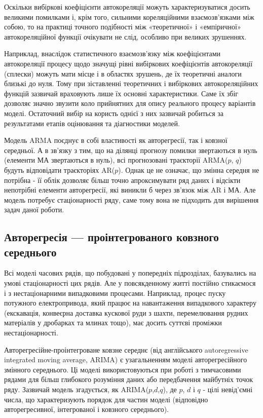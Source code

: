 Оскільки вибіркові коефіцієнти автокореляції можуть характеризуватися досить великими помилками і, крім того, сильними кореляційними взаємозв'язками між собою, то на практиці точного подібності між «теоретичної» і «емпіричної» автокореляційної функції очікувати не слід, особливо при великих зрушеннях. 

Наприклад, внаслідок статистичного взаємозв'язку між коефіцієнтами автокореляції процесу щодо значущі рівні вибіркових коефіцієнтів автокореляції (сплески) можуть мати місце і в областях зрушень, де їх теоретичні аналоги близькі до нуля. Тому при зіставленні теоретичних і вибіркових автокореляційних функцій зазвичай враховують лише їх основні характеристики. Саме їх збіг дозволяє значно звузити коло прийнятних для опису реального процесу варіантів моделі. Остаточний вибір на користь однієї з них зазвичай робиться за результатами етапів оцінювання та діагностики моделей.

Модель ARMA поєднує в собі властивості як авторегресії, так і ковзної середньої. А в зв'язку з тим, що на ділянці прогнозу помилки звертаються в нуль (елементи МА звертаються в нуль), всі прогнозовані траєкторії ARMA($p$, $q$) будуть відповідати траєкторіях AR($p$). Однак це не означає, що змінна середня не потрібна - її облік дозволяє більш точно апроксимувати ряд даних і відсікти непотрібні елементи авторегресії, які виникли б через зв'язок між AR і МА. Але модель потребує стаціонарності ряду, саме тому вона не підходить для вирішення задач даної роботи.

\subsection{Авторегресія — проінтегрованого ковзного середнього}

Всі моделі часових рядів, що побудовані у попередніх підрозділах, базувались на умові стаціонарності цих рядів. Але у повсякденному житті постійно стикаємося і з нестаціонарними випадковими процесами. Наприклад, процес пуску потужного електропривода, який працює на навантаження випадкового характеру (екскавація, конвеєрна доставка кускової руди з шахти, перемелювання рудних матеріалів у дробарках та млинах тощо), має досить суттєві проміжки нестаціонарності.

Авторегресійне-проінтегроване ковзне середнє (від англійського autoregressive integrated moving average, ARIMA) є узагальненням моделі авторегресійного змінного середнього. Ці моделі використовуються при роботі з тимчасовими рядами для більш глибокого розуміння даних або передбачення майбутніх точок ряду. Зазвичай модель згадується, як ARIMA($p$,$d$,$q$), де $p$, $d$ і $q$ - цілі невід'ємні числа, що характеризують порядок для частин моделі (відповідно авторегресивної, інтегрованої і ковзного середнього).

